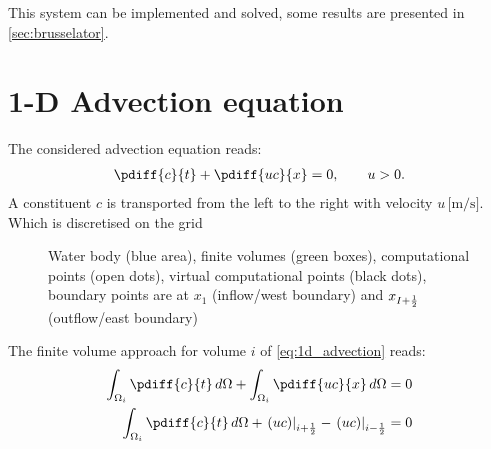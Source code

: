 This system can be implemented and solved, some results are presented in \autoref{sec:brusselator}.
%
\section{1-D Advection equation}\label{sec:1d_advection_equation}
The considered advection equation reads:
\begin{align}
    \pdiff{c}{t} + \pdiff{uc}{x} = 0, \qquad u>0. \label{eq:1d_advection}
\end{align}
A constituent $c$ is transported from the left to the right with  velocity $u\, \si{[\meter\per\second]}$.
Which is discretised on the grid
\begin{figure}[H]
    \centering
    \begin{center}
        \resizebox{0.8\textwidth}{!}{
            
        }
    \end{center}
    \caption{Water body (blue area), finite volumes (green boxes), computational points (open dots), virtual computational points (black dots), boundary points are at $x_{1}$ (inflow/west boundary) and $x_{I+\frac{1}{2}}$ (outflow/east boundary)}\label{fig:water_body_fve_bc_at_node_1}
\end{figure}
The finite volume approach for volume $i$ of \autoref{eq:1d_advection} reads:
\begin{align}
    \int_{\Omega_i} \pdiff{c}{t}\, d\Omega + \int_{\Omega_i} \pdiff{uc}{x} \, d\Omega = 0
    \\
    \int_{\Omega_i} \pdiff{c}{t}\, d\Omega + \left. (uc) \right|_{i+\half} -  \left. (uc) \right|_{i-\half} = 0
\end{align}

